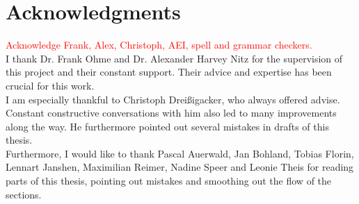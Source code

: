 \section{Acknowledgments}
\textcolor{red}{Acknowledge Frank, Alex, Christoph, AEI, spell and grammar checkers.}\\
I thank Dr. Frank Ohme and Dr. Alexander Harvey Nitz for the supervision of this project and their constant support. Their advice and expertise has been crucial for this work.\\
I am especially thankful to Christoph Dreißigacker, who always offered advise. Constant constructive conversations with him also led to many improvements along the way. He furthermore pointed out several mistakes in drafts of this thesis.\\
Furthermore, I would like to thank Pascal Auerwald, Jan Bohland, Tobias Florin, Lennart Janshen, Maximilian Reimer, Nadine Speer and Leonie Theis for reading parts of this thesis, pointing out mistakes and smoothing out the flow of the sections.
